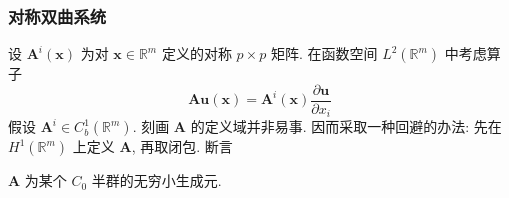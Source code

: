 \subsubsection{对称双曲系统}\label{subsec:semigroup-symmetric-hyperbolic-systems}

设 $\bm{A}^i(\bm{x})$ 为对 $\bm{x}\in\mathbb{R}^m$ 定义的对称 $p\times p$ 矩阵. 在函数空间 $L^2(\mathbb{R}^m)$ 中考虑算子
\begin{equation}\label{eq:semigroup-symmetric-hyperbolic-spatial-operator}
\bm{A}\bm{u}(\bm{x})=\bm{A}^i(\bm{x})\dfrac{\partial\bm{u}}{\partial x_i}
\end{equation}
假设 $\bm{A}^i\in C_b^1(\mathbb{R}^m)$. 刻画 $\bm{A}$ 的定义域并非易事. 因而采取一种回避的办法: 先在 $H^1(\mathbb{R}^m)$ 上定义 $\bm{A}$, 再取闭包. 断言

\begin{Theorem}
\label{thm:symmetric-hyperbolic-semigroup-generation}
$\bm{A}$ 为某个 $C_0$ 半群的无穷小生成元.
\end{Theorem}

\begingroup
\renewcommand{\endProof}{\par}
\endgroup

